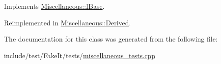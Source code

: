Implements \mbox{\hyperlink{classMiscellaneous_1_1IBase_aacf5193ff90d226c8d553f5c9a18e4d3}{Miscellaneous\+::\+I\+Base}}.



Reimplemented in \mbox{\hyperlink{classMiscellaneous_1_1Derived_a580f237659791e97b60e1cd57aadc361}{Miscellaneous\+::\+Derived}}.



The documentation for this class was generated from the following file\+:\begin{DoxyCompactItemize}
\item 
include/test/\+Fake\+It/tests/\mbox{\hyperlink{miscellaneous__tests_8cpp}{miscellaneous\+\_\+tests.\+cpp}}\end{DoxyCompactItemize}
